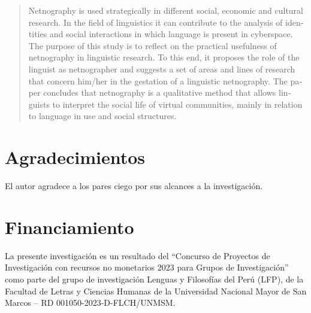 \documentclass[spanish]{textolivre}
\begin{document}
\begin{polyabstract}
\begin{english}
\begin{abstract}
    Netnography is used strategically in different social, economic and cultural research. In the field of linguistics it can contribute to the analysis of identities and social interactions in which language is present in cyberspace. The purpose of this study is to reflect on the practical usefulness of netnography in linguistic research. To this end, it proposes the role of the linguist as netnographer and suggests a set of areas and lines of research that concern him/her in the gestation of a linguistic netnography. The paper concludes that netnography is a qualitative method that allows linguists to interpret the social life of virtual communities, mainly in relation to language in use and social structures.

\end{abstract}
\end{english}
\end{polyabstract}







\section{Agradecimientos}
El autor agradece a los pares ciego por sus alcances a la investigación.

\section{Financiamiento}
La presente investigación es un resultado del “Concurso de Proyectos de Investigación con recursos no monetarios 2023 para Grupos de Investigación” como parte del grupo de investigación Lenguas y Filosofías del Perú (LFP), de la Facultad de Letras y Ciencias Humanas de la Universidad Nacional Mayor de San Marcos – RD 001050-2023-D-FLCH/UNMSM.


\printbibliography\label{sec-bib}
\end{document}
